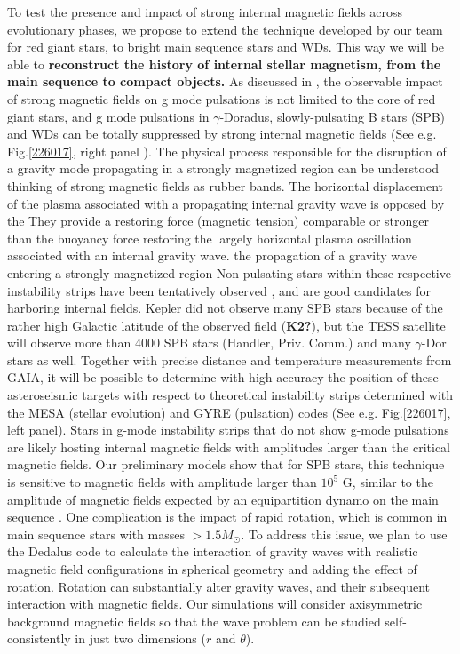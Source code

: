 To test the presence and impact of strong internal magnetic fields across evolutionary phases,
we propose to extend the technique developed by our team for red giant stars, to bright main sequence stars and WDs. This way we will be able to \textbf{reconstruct the history of internal stellar magnetism, from the main sequence to compact objects.} As discussed in \citet{Cantiello_2016}, the observable impact of strong magnetic fields on g mode pulsations is not limited to the core of red giant stars, and
 g mode pulsations in $\gamma$-Doradus, slowly-pulsating B stars (SPB) and WDs can be totally suppressed by strong internal magnetic fields (See e.g. Fig.\ref{226017}, right panel ). The physical process responsible for the disruption of a gravity mode propagating in a strongly magnetized region can be understood thinking of strong magnetic fields as rubber bands. The horizontal displacement of the plasma associated with a propagating internal gravity wave is opposed by the   They provide a restoring force (magnetic tension) comparable or stronger than the buoyancy force restoring the largely horizontal plasma oscillation associated with an internal gravity wave.  the propagation of a gravity wave entering a strongly magnetized region 
Non-pulsating stars within these respective instability strips have been tentatively observed \citep{Balona_2011}, and are good candidates for harboring internal fields.
Kepler did not observe many SPB stars because of the rather high Galactic latitude of the observed field (\textbf{K2?}), but the TESS satellite will observe more than 4000 SPB stars (Handler, Priv. Comm.) and many $\gamma$-Dor stars as well. Together with precise distance and temperature measurements from GAIA, it will be possible to determine with high accuracy the position of these asteroseismic targets with respect to
theoretical instability strips determined with the MESA (stellar evolution) and GYRE (pulsation) codes (See e.g. Fig.\ref{226017}, left panel).
Stars in g-mode instability strips that do not show g-mode pulsations are likely hosting internal magnetic fields with amplitudes larger than the critical
magnetic fields. Our preliminary models show that for SPB stars, this technique is sensitive to magnetic fields with amplitude larger than $10^5$ G,
similar to the amplitude of magnetic fields expected by an equipartition dynamo on the main sequence \citep[See e.g.][]{Featherstone_2009,Augustson_2016}.
One complication is the impact of rapid rotation, which is common in main sequence stars with masses $> 1.5M_\odot$. To address this issue,
we plan to use the Dedalus code to calculate the interaction of gravity waves with realistic magnetic field configurations in spherical geometry \citep[e.g.][]{Braithwaite_2006} 
and adding the effect of rotation. Rotation can substantially alter gravity waves, and their subsequent interaction with magnetic fields. Our simulations will consider axisymmetric background magnetic fields so that the wave problem can be studied self-consistently in just two dimensions ($r$ and $\theta$). 